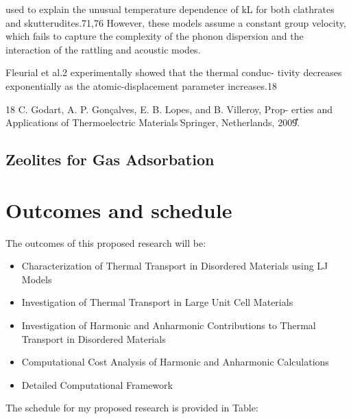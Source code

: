 \documentclass[letterpaper,12pt]{article}
\begin{document}
used to explain the unusual temperature
dependence of kL for both clathrates and
skutterudites.71,76 However, these models
assume a constant group velocity, which
fails to capture the complexity of the
phonon dispersion and the interaction of
the rattling and acoustic modes.


Fleurial et al.2 experimentally showed that the thermal conduc-
tivity decreases exponentially as the atomic-displacement
parameter increases.18

18
C. Godart, A. P. Gonçalves, E. B. Lopes, and B. Villeroy, Prop-
erties and Applications of Thermoelectric Materials ͑Springer,
Netherlands, 2009͒.

\subsection{\label{S-Intro-Motivation} Zeolites for Gas Adsorbation }



\clearpage

\section{\label{S-summaryschedule}Outcomes and schedule}

The outcomes of this proposed research will be:

\begin{itemize}

\item Characterization of Thermal Transport in Disordered Materials using LJ Models

\item Investigation of Thermal Transport in Large Unit Cell Materials

\item Investigation of Harmonic and Anharmonic Contributions to Thermal Transport in Disordered Materials

\item Computational Cost Analysis of Harmonic and Anharmonic Calculations

\item Detailed Computational Framework


\end{itemize}

The schedule for my proposed research is provided in Table:
\end{document}
